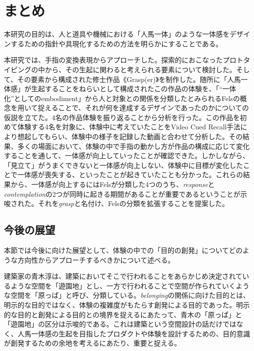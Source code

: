 \chapter{まとめ}
\label{matome}
本研究の目的は、人と道具や機械における「人馬一体」のような一体感をデザインするための指針や具現化するための方法を明らかにすることである。

本研究では、手指の変換表現からアプローチした。探索的におこなったプロトタイピングの中から、その生起に関わると考えられる要素について検討した。そして、その要素から構成された修士作品《Grasp(er)》を制作した。随所に「人馬一体感」が生起することをねらいとして構成されたこの作品の体験を、「``一体化''としてのembodiment」から人と対象との関係を分類したとみられるFelsの概念を用いて捉えることで、それが何を達成するデザインであったのかについての仮説を立てた。4名の作品体験を振り返ることから分析を行った。この作品を初めて体験する4名を対象に、体験中に考えていたことをVideo Cued Recall手法により想起してもらい、体験中の様子を記録した動画と合わせて分析した。その結果、多くの場面において、体験の中で手指の動かし方が作品の構成に応じて変化することを通して、一体感が向上していったことが確認できた。しかしながら、「見立て」がうまくできないと一体感が向上しない、体験中に目標が変化したことで一体感が喪失する、といったことが起きていたことも分かった。これらの結果から、一体感が向上するにはFelsが分類した4つのうち、\textit{response}と\textit{contemplation}の2つが同時に起きる期間があることが重要であるということが示唆された。それを\textit{grasp}と名付け、Felsの分類を拡張することを提案した。

\section{今後の展望}

本節では今後に向けた展望として、体験の中での「目的の創発」についてどのような方向性からアプローチするべきかについて述べる。

建築家の青木淳\cite{aoki2004harappa}は、建築においてそこで行われることをあらかじめ決定されているような空間を「遊園地」とし、一方で行われることで空間が作られていくような空間を「原っぱ」と呼び、分類している。\textit{belonging}の関係に向けた目的とは、明示的な目的ではなく、体験の複雑度がもたらす創発による目的であった。明示的な目的と創発による目的との境界を捉えるにあたって、青木の「原っぱ」と「遊園地」の区分は示唆的である。これは建築という空間設計の話だけではなく、人馬一体感の生起を目指したプロダクトや体験を設計するための、目的意識が創発するための余地を考えるにあたり、重要と捉える。

